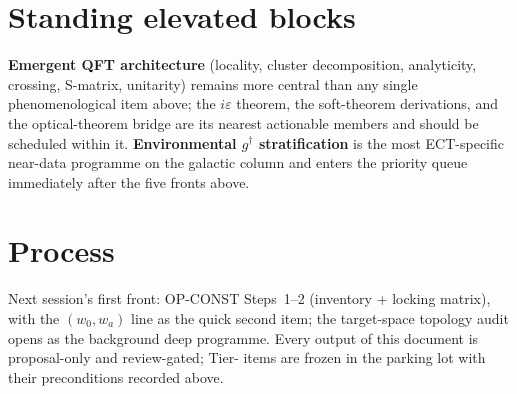 \documentclass[11pt,a4paper]{article}
\begin{document}
\section{Standing elevated blocks}
\textbf{Emergent QFT architecture} (locality, cluster decomposition, analyticity,
crossing, S-matrix, unitarity) remains more central than any single phenomenological
item above; the $i\varepsilon$ theorem, the soft-theorem derivations, and the
optical-theorem bridge are its nearest actionable members and should be scheduled
within it. \textbf{Environmental $g^\dagger$ stratification} is the most ECT-specific
near-data programme on the galactic column and enters the priority queue immediately
after the five fronts above.

\section{Process}
Next session's first front: OP-CONST Steps~1--2 (inventory + locking matrix), with
the $(w_0,w_a)$ line as the quick second item; the target-space topology audit opens
as the background deep programme. Every output of this document is proposal-only and
review-gated; Tier-\TD{} items are frozen in the parking lot with their preconditions
recorded above.
\end{document}
